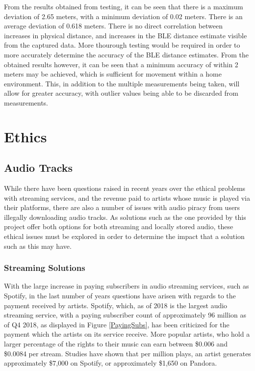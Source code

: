 \documentclass[11pt,a4paper,headinclude=false,footinclude=false]{scrreprt}
\begin{document}
From the results obtained from testing, it can be seen that there is a
maximum deviation of 2.65 meters, with a minimum deviation of 0.02
meters. There is an average deviation of 0.618 meters. There is no
direct correlation between increases in physical distance, and increases
in the BLE distance estimate visible from the captured data. More
thourough testing would be required in order to more accurately
determine the accuracy of the BLE distance estimates. From the obtained
results however, it can be seen that a minimum accuracy of within 2
meters may be achieved, which is sufficient for movement within a home
environment. This, in addition to the multiple measurements being taken,
will allow for greater accuracy, with outlier values being able to be
discarded from measurements.

\chapter{Ethics}\label{ethics}

\section{Audio Tracks}\label{audio-tracks}

While there have been questions raised in recent years over the ethical
problems with streaming services, and the revenue paid to artists whose
music is played via their platforms, there are also a number of issues
with audio piracy from users illegally downloading audio tracks. As
solutions such as the one provided by this project offer both options
for both streaming and locally stored audio, these ethical issues must
be explored in order to determine the impact that a solution such as
this may have.

\subsection{Streaming Solutions}\label{streaming-solutions}

With the large increase in paying subscribers in audio streaming
services, such as Spotify, in the last number of years questions have
arisen with regards to the payment received by artists. Spotify, which,
as of 2018\cite{SpotPay18} is the largest audio streaming service, with
a paying subscriber count of approximately 96 million as of Q4
2018\cite{SpotSubs18}, as displayed in Figure \ref{PayingSubs}, has been
criticized for the payment which the artists on its service receive.
More popular artists, who hold a larger percentage of the rights to
their music can earn between \$0.006 and \$0.0084 per stream. Studies
have shown that per million plays, an artist generates approximately
\$7,000 on Spotify, or approximately \$1,650 on
Pandora\cite{CNBCSpot18}.
\end{document}
